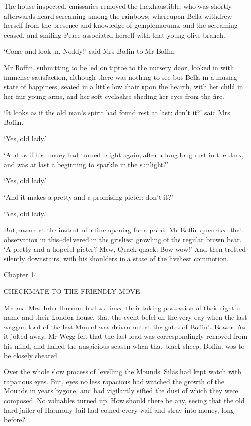 The house inspected, emissaries removed the Inexhaustible, who was
shortly afterwards heard screaming among the rainbows; whereupon Bella
withdrew herself from the presence and knowledge of gemplemorums, and
the screaming ceased, and smiling Peace associated herself with that
young olive branch.

‘Come and look in, Noddy!’ said Mrs Boffin to Mr Boffin.

Mr Boffin, submitting to be led on tiptoe to the nursery door, looked in
with immense satisfaction, although there was nothing to see but Bella
in a musing state of happiness, seated in a little low chair upon the
hearth, with her child in her fair young arms, and her soft eyelashes
shading her eyes from the fire.

‘It looks as if the old man’s spirit had found rest at last; don’t it?’
said Mrs Boffin.

‘Yes, old lady.’

‘And as if his money had turned bright again, after a long long rust in
the dark, and was at last a beginning to sparkle in the sunlight?’

‘Yes, old lady.’

‘And it makes a pretty and a promising picter; don’t it?’

‘Yes, old lady.’

But, aware at the instant of a fine opening for a point, Mr Boffin
quenched that observation in this--delivered in the grisliest growling
of the regular brown bear. ‘A pretty and a hopeful picter? Mew,
Quack quack, Bow-wow!’ And then trotted silently downstairs, with his
shoulders in a state of the liveliest commotion.



Chapter 14

CHECKMATE TO THE FRIENDLY MOVE


Mr and Mrs John Harmon had so timed their taking possession of their
rightful name and their London house, that the event befel on the very
day when the last waggon-load of the last Mound was driven out at the
gates of Boffin’s Bower. As it jolted away, Mr Wegg felt that the
last load was correspondingly removed from his mind, and hailed the
auspicious season when that black sheep, Boffin, was to be closely
sheared.

Over the whole slow process of levelling the Mounds, Silas had kept
watch with rapacious eyes. But, eyes no less rapacious had watched the
growth of the Mounds in years bygone, and had vigilantly sifted the dust
of which they were composed. No valuables turned up. How should there
be any, seeing that the old hard jailer of Harmony Jail had coined every
waif and stray into money, long before?

